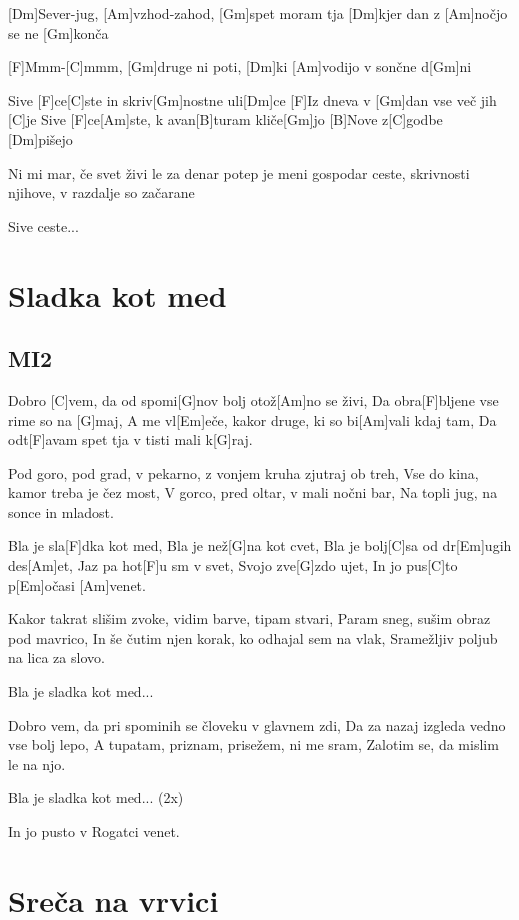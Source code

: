 \documentclass[a4paper,12pt]{article}
\begin{document}
\begin{multicols}{2}
\begin{guitar}
                       
[Dm]Sever-jug, [Am]vzhod-zahod, [Gm]spet moram tja 
[Dm]kjer dan z [Am]nočjo se ne [Gm]konča 

 
[F]Mmm-[C]mmm, [Gm]druge ni poti, 
[Dm]ki   [Am]vodijo v sončne d[Gm]ni 


Sive [F]ce[C]ste in skriv[Gm]nostne uli[Dm]ce
[F]Iz dneva v [Gm]dan vse več jih [C]je
Sive [F]ce[Am]ste, k avan[B]turam kliče[Gm]jo 
[B]Nove z[C]godbe [Dm]pišejo 


Ni mi mar, če svet živi le za denar 
potep je meni gospodar 
ceste, skrivnosti njihove, 
v razdalje so začarane 


Sive ceste...

\end{guitar}
\section{Sladka kot med}
\subsection*{MI2}
\begin{guitar}


Dobro [C]vem, da od spomi[G]nov bolj otož[Am]no se živi,
Da obra[F]bljene vse rime so na [G]maj,
A me vl[Em]eče, kakor druge, ki so bi[Am]vali kdaj tam,
Da odt[F]avam spet tja v tisti mali k[G]raj.


Pod goro, pod grad, v pekarno, 
z vonjem kruha zjutraj ob treh,
Vse do kina, kamor treba je čez most,
V gorco, pred oltar, v mali nočni bar,
Na topli jug, na sonce in mladost.


Bla je sla[F]dka kot med,
Bla je než[G]na kot cvet,
Bla je bolj[C]sa od dr[Em]ugih des[Am]et,
Jaz pa hot[F]u sm v svet,
Svojo zve[G]zdo ujet,
In jo pus[C]to p[Em]očasi [Am]venet.


Kakor takrat slišim zvoke,
vidim barve, tipam stvari,
Param sneg, sušim obraz pod mavrico,
In še čutim njen korak, ko odhajal sem na vlak,
Sramežljiv poljub na lica za slovo.


Bla je sladka kot med...


Dobro vem, da pri spominih 
se človeku v glavnem zdi,
Da za nazaj izgleda vedno vse bolj lepo,
A tupatam, priznam, prisežem, ni me sram,
Zalotim se, da mislim le na njo.


Bla je sladka kot med... (2x)

In jo pusto v Rogatci venet.


\end{guitar}
\section{Sreča na vrvici}

\end{multicols}
\end{document}
